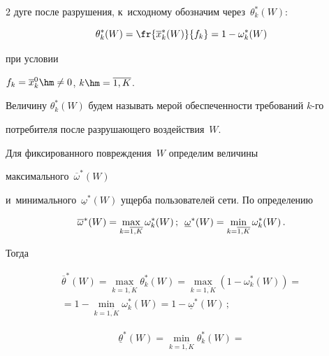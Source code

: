 \begin{multicols}{2}
дуге после разрушения, к~исходному обозначим через~$\theta_k^*(W)$:


$$


 \theta_k^*(W) = \fr{\overline x_k^*(W)}{f_k} = 1  -  \omega_k^*(W)


 $$  


 при условии 


 $f_k =  \overline x_k^0\hm\neq 0$, $k \hm= \overline{1, K}$.


Величину $\theta_k^*(W)$ будем называть мерой обеспеченности требований $k$-го 


потребителя после разрушающего воздействия~$W$.





Для фиксированного повреждения~$W$ определим величины 


максимального~$\overline {\omega}^*(W)$  


и~минимального~$\underline{\omega}^*(W)$ ущерба пользователей сети. По определению


$$


 \overline {\omega}^*(W) = \max\limits_{k = \overline{1, K}} \omega_k^*(W)\,; 


 \enskip \underline {\omega}^*(W) = \min\limits_{k = \overline{1, K}} \omega_k^*(W)\,.


 $$


Тогда


\begin{multline*}


 \overline {\theta}^*(W) = \max\limits_{k = \overline{1, K}} \theta_k^*(W) = 


\max\limits_{k = \overline{1, K}}\left(1 - \omega_k^*(W)\right) ={}\\


{}= 1 - 


\min\limits_{k = \overline{1, K}}\omega_k^*(W) = 1 - \underline {\omega}^*(W)\,; 


\end{multline*}





\vspace*{-12pt}





\noindent


\begin{multline*}


\underline {\theta}^*(W) = \min\limits_{k = \overline{1, K}} \theta_k^*(W) = 



\end{multline*}
\end{multicols}
